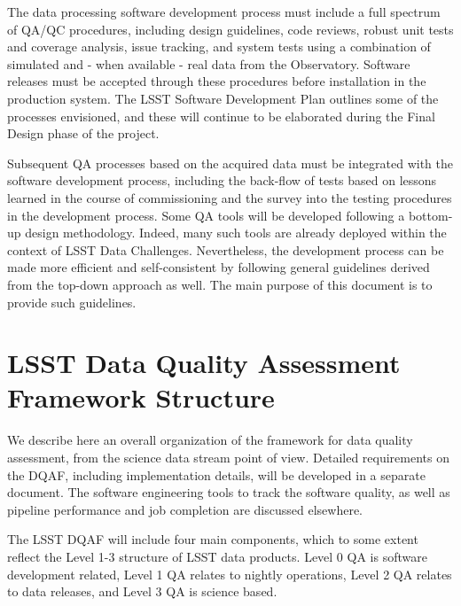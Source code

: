 \documentclass[SE,toc]{lsstdoc}
\begin{document}
The data processing software development process must include a full spectrum of QA/QC procedures, including design guidelines, code reviews, robust unit tests and coverage analysis, issue tracking, and system tests using a combination of simulated and - when available - real data from the Observatory.  Software releases must be accepted through these procedures before installation in the production system. The LSST Software Development Plan outlines some of the processes envisioned, and these will continue to be elaborated during the Final Design phase of the project.

Subsequent QA processes based on the acquired data must be integrated with the software development process, including the back-flow of tests based on lessons learned in the course of commissioning and the survey into the testing procedures in the development process.
Some QA tools will be developed following a bottom-up design methodology. Indeed,
many such tools are already deployed within the context of LSST Data Challenges.
Nevertheless, the development process can be made more efficient and self-consistent
by following general guidelines derived from the top-down approach as well. The main purpose of
this document is to provide such guidelines.


\section{LSST Data Quality Assessment Framework Structure}

We describe here an overall organization of the framework for data quality assessment, from the science data stream point of view.  Detailed requirements on the DQAF, including implementation details, will be developed in a separate document.
The software engineering tools to track the software quality, as well as
pipeline performance and job completion are discussed elsewhere.

The LSST DQAF will include four main components, which to some extent reflect
the Level 1-3 structure of LSST data products.  Level 0 QA is software development related, Level 1 QA relates to nightly operations, Level 2 QA relates to data releases, and Level 3 QA is science based.
\end{document}
